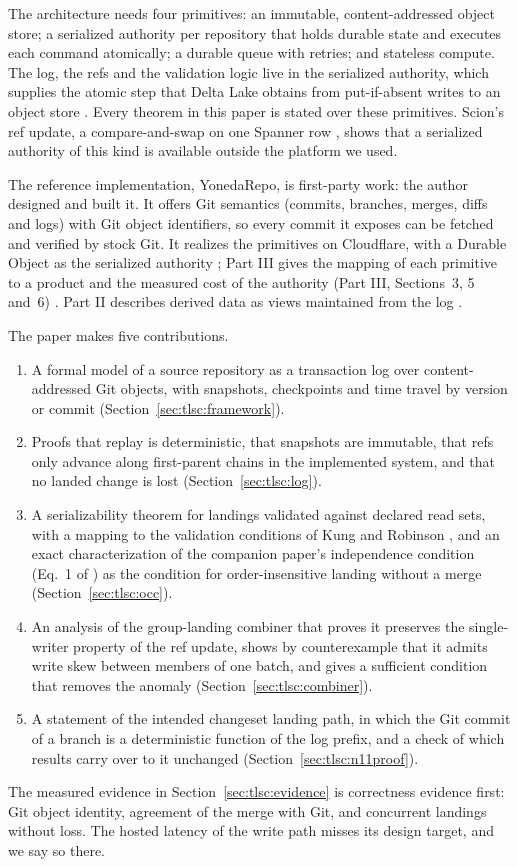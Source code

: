 \documentclass[11pt,letterpaper]{article}
\theoremstyle{definition}
\theoremstyle{remark}
\begin{document}
The architecture needs four primitives: an immutable, content-addressed object store; a serialized authority per repository that holds durable state and executes each command atomically; a durable queue with retries; and stateless compute. The log, the refs and the validation logic live in the serialized authority, which supplies the atomic step that Delta Lake obtains from put-if-absent writes to an object store \cite{armbrust2020delta}. Every theorem in this paper is stated over these primitives. Scion's ref update, a compare-and-swap on one Spanner row \cite{anthropic2026scion,corbett2012spanner}, shows that a serialized authority of this kind is available outside the platform we used.

The reference implementation, YonedaRepo, is first-party work: the author designed and built it. It offers Git semantics (commits, branches, merges, diffs and logs) with Git object identifiers, so every commit it exposes can be fetched and verified by stock Git. It realizes the primitives on Cloudflare, with a Durable Object as the serialized authority \cite{cfdoconcepts,cfdosqlite}; Part III gives the mapping of each primitive to a product and the measured cost of the authority (Part III, Sections~3, 5 and~6) \cite{long2026partIII}. Part II describes derived data as views maintained from the log \cite{long2026partII}.

The paper makes five contributions.
\begin{enumerate}
\item A formal model of a source repository as a transaction log over content-addressed Git objects, with snapshots, checkpoints and time travel by version or commit (Section~\ref{sec:tlsc:framework}).
\item Proofs that replay is deterministic, that snapshots are immutable, that refs only advance along first-parent chains in the implemented system, and that no landed change is lost (Section~\ref{sec:tlsc:log}).
\item A serializability theorem for landings validated against declared read sets, with a mapping to the validation conditions of Kung and Robinson \cite{kung1981occ}, and an exact characterization of the companion paper's independence condition (Eq.~1 of \cite{long2026inversion}) as the condition for order-insensitive landing without a merge (Section~\ref{sec:tlsc:occ}).
\item An analysis of the group-landing combiner that proves it preserves the single-writer property of the ref update, shows by counterexample that it admits write skew between members of one batch, and gives a sufficient condition that removes the anomaly (Section~\ref{sec:tlsc:combiner}).
\item A statement of the intended changeset landing path, in which the Git commit of a branch is a deterministic function of the log prefix, and a check of which results carry over to it unchanged (Section~\ref{sec:tlsc:n11proof}).
\end{enumerate}
The measured evidence in Section~\ref{sec:tlsc:evidence} is correctness evidence first: Git object identity, agreement of the merge with Git, and concurrent landings without loss. The hosted latency of the write path misses its design target, and we say so there.
\end{document}
